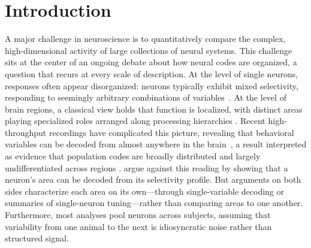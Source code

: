 \section{Introduction}

A major challenge in neuroscience is to quantitatively compare the complex, high-dimensional activity of large collections of neural systems. This challenge sits at the center of an ongoing debate about how neural codes are organized, a question that recurs at every scale of description. At the level of single neurons, responses often appear disorganized: neurons typically exhibit mixed selectivity, responding to seemingly arbitrary combinations of variables~\parencite{rigotti2013,tye2024,ostojic2024,posani2026}. At the level of brain regions, a classical view holds that function is localized, with distinct areas playing specialized roles arranged along processing hierarchies \parencite{petersen2024principles}. Recent high-throughput recordings have complicated this picture, revealing that behavioral variables can be decoded from almost anywhere in the brain~\parencite{steinmetz2019distributed,stringer2019spontaneous,musall2019, findling2025brain,angelaki2025brain,rosen2026distributed,schartner2025, bondy2025}, a result interpreted as evidence that population codes are broadly distributed and largely undifferentiated across regions \parencite{hayden2026rethinking,fine2021whole,Lloreda2025}.
\textcite{posani2026} argue against this reading by showing that a neuron's area can be decoded from its selectivity profile.
But arguments on both sides characterize each area on its own---through single-variable decoding or summaries of single-neuron tuning---rather than comparing areas to one another.
Furthermore, most analyses pool neurons across subjects, assuming that variability from one animal to the next is idiosyncratic noise rather than structured signal.

